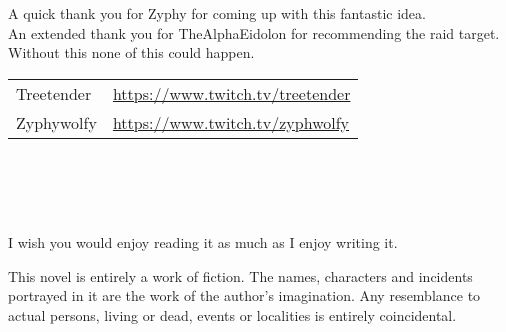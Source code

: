 
{\small
\setlength{\parindent}{0em}\setlength{\parskip}{1em}

A quick thank you for Zyphy for coming up with this fantastic idea.\\
An extended thank you for TheAlphaEidolon for recommending the raid target. Without this none of this could happen.\\

\begin{tabular}{ l l }
  \hline
  Treetender & \url{https://www.twitch.tv/treetender}\\
  Zyphywolfy & \url{https://www.twitch.tv/zyphwolfy} \\
\hline
\end{tabular}\\ \\ \\ \\
I wish you would enjoy reading it as much as I enjoy writing it.
\vfill




This novel is entirely a work of fiction. The names, characters and incidents portrayed in it are the work of the author’s imagination. Any resemblance to actual persons, living or dead, events or localities is entirely coincidental.


}
